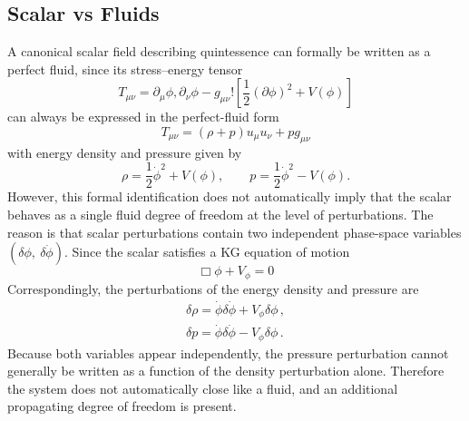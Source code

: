 

\subsection{Scalar vs Fluids}
A canonical scalar field describing quintessence can formally be written as a perfect fluid, since its stress–energy tensor
\begin{equation}
T_{\mu\nu}=\partial_\mu\phi,\partial_\nu\phi-g_{\mu\nu}!\left[\frac12(\partial\phi)^2+V(\phi)\right]    
\end{equation}
can always be expressed in the perfect-fluid form
\begin{equation}
T_{\mu\nu}=(\rho+p)u_\mu u_\nu+p g_{\mu\nu}    
\end{equation}
with energy density and pressure given by
\begin{equation}
\rho=\frac12\dot\phi^2+V(\phi), \qquad
p=\frac12\dot\phi^2-V(\phi).    
\end{equation}
However, this formal identification does not automatically imply that the scalar behaves as a single fluid degree of freedom at the level of perturbations. The reason is that scalar perturbations contain two independent phase-space variables $(\delta\phi,\ \delta\dot\phi)$. Since the scalar satisfies a KG equation of motion
\begin{equation}
\Box\phi+V_\phi=0
\end{equation}
Correspondingly, the perturbations of the energy density and pressure are
\begin{align}
\delta\rho=\dot\phi\delta\dot\phi+V_{\phi}\delta\phi\,,   \\ 
\delta p=\dot\phi\delta\dot\phi-V_{\phi}\delta\phi\,.
\end{align}
Because both variables appear independently, the pressure perturbation cannot generally be written as a function of the density perturbation alone. Therefore the system does not automatically close like a fluid, and an additional propagating degree of freedom is present. 

